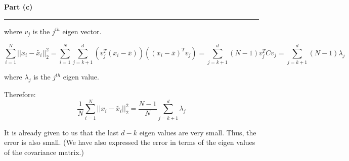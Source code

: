 \documentclass[a4paper,12pt]{article}
\newenvironment{solution}[2][]{%
    \begin{mdframed}[linecolor=blue!70!black, linewidth=2pt, roundcorner=10pt, backgroundcolor=yellow!10!white, skipabove=12pt, skipbelow=12pt]%
        \textbf{\large #2}
        \par\noindent\rule{\textwidth}{0.4pt}
}{
    \end{mdframed}
}
\begin{document}
\begin{solution}{Part (c)}
where $v_j$ is the $j^{th}$ eigen vector. 

\begin{equation}
  \sum_{i=1}^{N} ||x_i-\tilde{x_i}||_2^2 = \sum_{i=1}^{N} \sum_{j=k+1}^{d} (v_j^T(x_i - \bar{x})) ((x_i - \bar{x})^Tv_j) = \sum_{j=k+1}^{d} (N-1) v_j^TCv_j = \sum_{j=k+1}^{d} (N-1) \lambda_j
\end{equation}

where $\lambda_j$ is the $j^{th}$ eigen value. 

Therefore:
\begin{equation}
  \frac{1}{N} \sum_{i=1}^{N} ||x_i-\tilde{x_i}||_2^2 = \frac{N-1}{N} \sum_{j=k+1}^{d} \lambda_j
\end{equation}

It is already given to us that the last $d-k$ eigen values are very small. Thus, the error is also small. (We have also expressed the error in terms of the eigen values of the covariance matrix.)
\end{solution}
\end{document}
